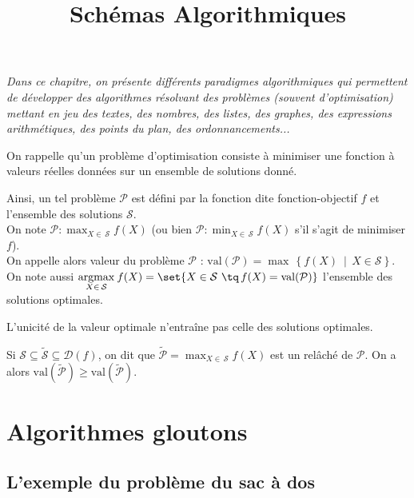 \documentclass{article}
\title{Schémas Algorithmiques}
\author{}
\date{}
\newcommand{\1}{\bbm{1}}
\begin{document}
	\maketitle
	\begin{center}
		\textsl{Dans ce chapitre, on présente différents paradigmes algorithmiques qui permettent de développer des algorithmes résolvant des problèmes (souvent d'optimisation) mettant en jeu des textes, des nombres, des listes, des graphes, des expressions arithmétiques, des points du plan, des ordonnancements...}
	\end{center}
	
	 On rappelle qu'un problème d'optimisation consiste à minimiser une fonction à valeurs réelles données sur un ensemble de solutions donné.

	 Ainsi, un tel problème $\mathcal{P}$ est défini par la fonction dite fonction-objectif $f$ et l'ensemble des solutions $\mathcal{S}$. \\
	On note 
	$\mathcal{P} : \max_{X \in \, \mathcal{S}} f(X) $ 
	(ou bien $ \mathcal{P} : \min_{X \in \, \mathcal{S}} f(X) $ s'il s'agit de minimiser $f$). \\
	On appelle alors valeur du problème $\mathcal{P}$ :
	$\mathrm{val} (\mathcal{P}) = \max \, \! \left\{ f(X) \ \middle| \, X \in \mathcal{S} \right\} $. \\
	On note aussi $\displaystyle \underset{X \in \, \mathcal{S}}{\mathrm{argmax}} \: f(X) = \set{X \in \mathcal{S} \ \tq \, f(X) = \mathrm{val} (\mathcal{P})}$ l'ensemble des solutions optimales.

	\rem L'unicité de la valeur optimale n'entraîne pas celle des solutions optimales.

	\rem Si \( \mathcal{S} \subseteq \widetilde{\mathcal{S}} \subseteq \mathcal{D} (f)\), on dit que \( \widetilde{\mathcal{P}} = \displaystyle \max_{X \in \, \mathcal{S}} f(X) \) est un relâché de $\mathcal{P}$. 
	On a alors \( \mathrm{val} (\widetilde{\mathcal{P}}) \geq \mathrm{val} (\widetilde{\mathcal{P}}) \).
	
	\section{Algorithmes gloutons}
	
		\subsection{L'exemple du problème du sac à dos}
		
\end{document}
